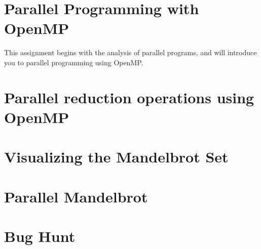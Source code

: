 \documentclass[unicode,11pt,a4paper,oneside,numbers=endperiod,openany]{scrartcl}
\begin{document}
\setassignment
{}

\newline

\section*{Parallel Programming with OpenMP }
This assignment begins with the analysis of parallel programs, and
will introduce you to parallel programming using OpenMP. 


\section{Parallel reduction operations using OpenMP }

\section{Visualizing the Mandelbrot Set }

\section{Parallel Mandelbrot }

\section{Bug Hunt }
\end{document}

